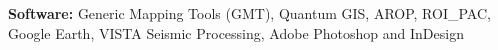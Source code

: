 
\vspace{5pt}

\textbf{Software:} Generic Mapping Tools (GMT), Quantum GIS, AROP, ROI\_PAC, Google Earth, VISTA Seismic Processing, Adobe Photoshop and InDesign
